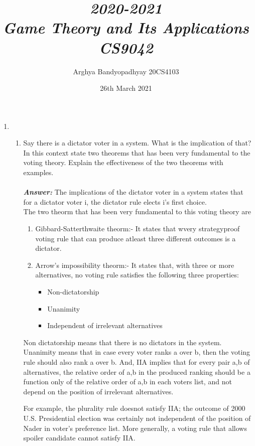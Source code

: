 \documentclass[12pt]{article}
\title{\emph{2020-2021\\Game Theory and Its Applications\\CS9042}}
\author{
Arghya Bandyopadhyay 20CS4103
}
\date{26th March 2021}
\begin{document}
\maketitle
\begin{enumerate}
\item
\begin{enumerate}
\item

Say there is a dictator voter in a system. What is the implication
of that? In this context state two theorems that has been very
fundamental to the voting theory. Explain the effectiveness of the
two theorems with examples.\\\\
\textbf{\emph{Answer: }}The implications of the dictator voter in a system states that for a dictator voter i, the dictator rule elects i's first choice.\\
The two theorm that has been very fundamental to this voting theory are\\

\begin{enumerate}
\item Gibbard-Satterthwaite theorm:- It states that wvery strategyproof voting rule that can produce atleast three different outcomes is a dictator.
\item Arrow's impossibility theorm:- It states that, with three or more alternatives, no voting rule satisfies the following three properties:
\begin{itemize}
\item Non-dictatorship
\item Unanimity
\item Independent of irrelevant alternatives
\end{itemize}
\end{enumerate}

Non dictatorship means that there is no dictators in the system. Unanimity means that in case every voter ranks a over b, then the voting rule should also rank a over b. And, IIA implies that for every pair a,b of alternatives, the relative order of a,b in the produced ranking should be a function only of the relative order of a,b in each voters list, and not depend on the position of irrelevant alternatives.

For example, the plurality rule doesnot satisfy IIA; the outcome of 2000 U.S. Presidential election was certainly not independent of the position of Nader in voter's preference list. More generally, a voting rule that allows spoiler candidate cannot satisfy IIA.\\


\end{enumerate}
\end{enumerate}
\end{document}

